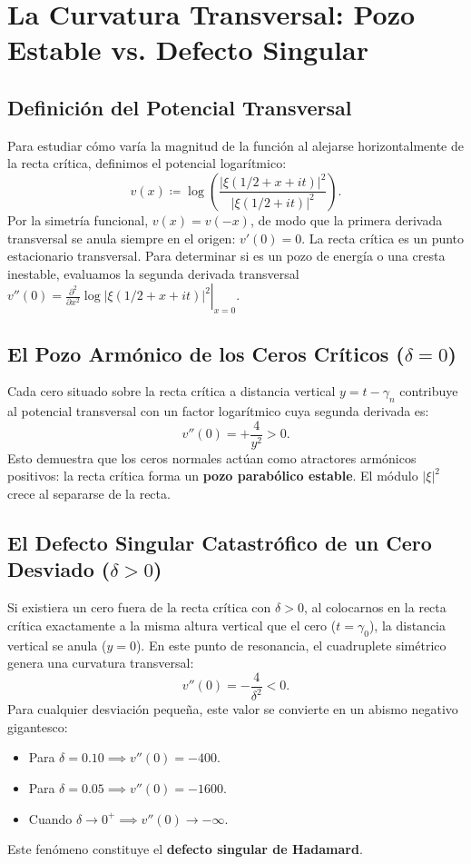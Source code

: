 \documentclass[11pt,a4paper]{article}
\theoremstyle{definition}
\theoremstyle{remark}
\begin{document}
\section{La Curvatura Transversal: Pozo Estable vs. Defecto Singular}

\subsection{Definición del Potencial Transversal}
Para estudiar cómo varía la magnitud de la función al alejarse horizontalmente de la recta crítica, definimos el potencial logarítmico:
\begin{equation}
v(x) \coloneqq \log \left(\frac{|\xi(1/2 + x + it)|^2}{|\xi(1/2 + it)|^2}\right).
\end{equation}
Por la simetría funcional, $v(x) = v(-x)$, de modo que la primera derivada transversal se anula siempre en el origen: $v'(0) = 0$. La recta crítica es un punto estacionario transversal. Para determinar si es un pozo de energía o una cresta inestable, evaluamos la segunda derivada transversal $v''(0) = \left.\frac{\partial^2}{\partial x^2}\log |\xi(1/2 + x + it)|^2\right|_{x=0}$.

\subsection{El Pozo Armónico de los Ceros Críticos (\texorpdfstring{$\delta = 0$}{delta = 0})}
Cada cero situado sobre la recta crítica a distancia vertical $y = t - \gamma_n$ contribuye al potencial transversal con un factor logarítmico cuya segunda derivada es:
\begin{equation}
v''(0) = +\frac{4}{y^2} > 0.
\end{equation}
Esto demuestra que los ceros normales actúan como atractores armónicos positivos: la recta crítica forma un \textbf{pozo parabólico estable}. El módulo $|\xi|^2$ crece al separarse de la recta.

\subsection{El Defecto Singular Catastrófico de un Cero Desviado (\texorpdfstring{$\delta > 0$}{delta > 0})}
Si existiera un cero fuera de la recta crítica con $\delta > 0$, al colocarnos en la recta crítica exactamente a la misma altura vertical que el cero ($t = \gamma_0$), la distancia vertical se anula ($y = 0$). En este punto de resonancia, el cuadruplete simétrico genera una curvatura transversal:
\begin{equation}
v''(0) = -\frac{4}{\delta^2} < 0.
\end{equation}
Para cualquier desviación pequeña, este valor se convierte en un abismo negativo gigantesco:
\begin{itemize}
    \item Para $\delta = 0.10 \implies v''(0) = -400$.
    \item Para $\delta = 0.05 \implies v''(0) = -1600$.
    \item Cuando $\delta \to 0^+ \implies v''(0) \to -\infty$.
\end{itemize}
Este fenómeno constituye el \textbf{defecto singular de Hadamard}.
\end{document}
